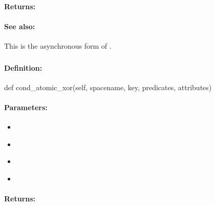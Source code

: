 \paragraph{Returns:}


\paragraph{See also:}  This is the asynchronous form of .

\pagebreak
\subsubsection{}
\label{api:python:cond_atomic_xor}


\paragraph{Definition:}
\begin{pythoncode}
def cond_atomic_xor(self, spacename, key, predicates, attributes)
\end{pythoncode}

\paragraph{Parameters:}
\begin{itemize}[noitemsep]
\item {}\\

\item {}\\

\item {}\\

\item {}\\

\end{itemize}

\paragraph{Returns:}


